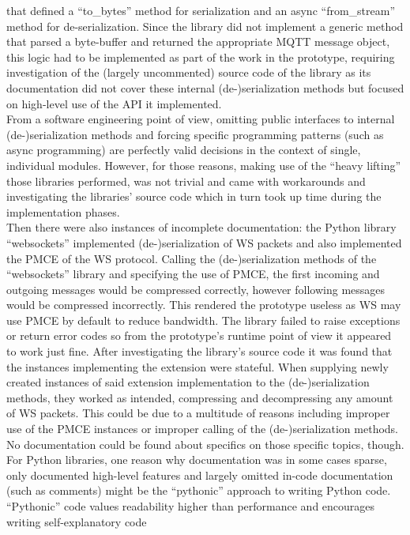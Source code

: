 that defined a \enquote{to\_bytes} method for serialization and an async \enquote{from\_stream} method for de-serialization. Since the library did not implement a generic method that parsed a byte-buffer and returned the appropriate \ac{MQTT} message object, this logic had to be implemented as part of the work in the prototype, requiring investigation of the (largely uncommented) source code of the library as its documentation did not cover these internal (de-)serialization methods but focused on high-level use of the API it implemented.\\
From a software engineering point of view, omitting public interfaces to internal (de-)serialization methods and forcing specific programming patterns (such as async programming) are perfectly valid decisions in the context of single, individual modules. However, for those reasons, making use of the \enquote{heavy lifting} those libraries performed, was not trivial and came with workarounds and investigating the libraries' source code which in turn took up time during the implementation phases.\\
Then there were also instances of incomplete documentation: the Python library \enquote{websockets} implemented (de-)serialization of \ac{WS} packets and also implemented the \ac{PMCE}%
of the \ac{WS} protocol. Calling the (de-)serialization methods of the \enquote{websockets} library and specifying the use of \ac{PMCE}, the first incoming and outgoing messages would be compressed correctly, however following messages would be compressed incorrectly. This rendered the prototype useless as \ac{WS} may use \ac{PMCE} by default to reduce bandwidth. The library failed to raise exceptions or return error codes so from the prototype's runtime point of view it appeared to work just fine. After investigating the library's source code it was found that the instances implementing the extension were stateful. When supplying newly created instances of said extension implementation to the (de-)serialization methods, they worked as intended, compressing and decompressing any amount of \ac{WS} packets. This could be due to a multitude of reasons including improper use of the \ac{PMCE} instances or improper calling of the (de-)serialization methods. No documentation could be found about specifics on those specific topics, though.\\
For Python libraries, one reason why documentation was in some cases sparse, only documented high-level features and largely omitted in-code documentation (such as comments) might be the \enquote{pythonic} approach to writing Python code. \enquote{Pythonic} code values readability higher than performance and encourages writing self-explanatory code%
